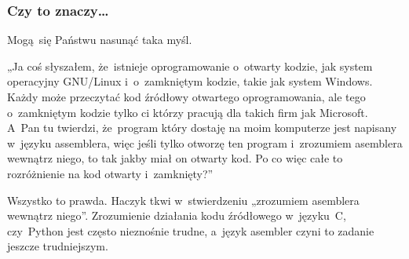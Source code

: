 \documentclass[10pt,t]{beamer}
\begin{document}
\begin{frame}
  \frametitle{Czy to znaczy\ldots}


  Mogą~się Państwu nasunąć taka myśl.

  „Ja coś słyszałem, że~istnieje oprogramowanie o~otwarty kodzie, jak
  system operacyjny GNU/Linux i~o~zamkniętym kodzie, takie jak system
  Windows. Każdy może przeczytać kod źródłowy otwartego oprogramowania,
  ale tego o~zamkniętym kodzie tylko ci którzy pracują dla takich firm jak
  Microsoft. A~Pan tu twierdzi, że~program który dostaję na moim komputerze
  jest napisany w~języku assemblera, więc jeśli tylko otworzę ten program
  i~zrozumiem asemblera wewnątrz niego, to tak jakby miał on otwarty kod.
  Po co więc całe to rozróżnienie na kod otwarty i~zamknięty?”

  Wszystko to prawda. Haczyk tkwi w~stwierdzeniu \alert{„zrozumiem asemblera
    wewnątrz niego”}. Zrozumienie działania kodu źródłowego w~języku~C,
  czy~Python jest często nieznośnie trudne, a~język asembler czyni to
  zadanie jeszcze trudniejszym.

\end{frame}
\end{document}
